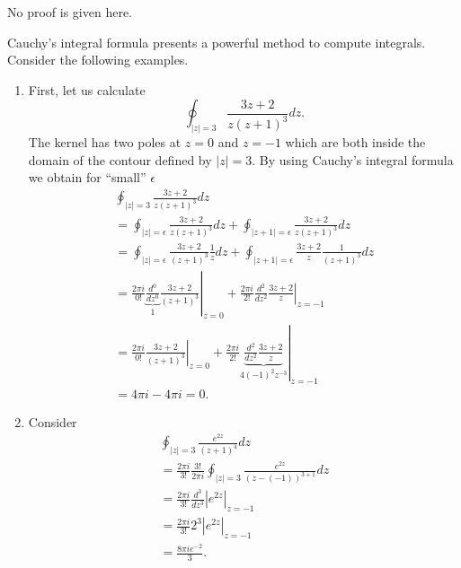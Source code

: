No proof is given here.


{
\color{blue}
\bexample
Cauchy's integral formula presents a powerful method to compute integrals.
Consider the following examples.

\begin{enumerate}

\item First,
let us calculate  $$\oint_{\vert z\vert =3} \frac{3z+2}{z(z+1)^3} dz.$$
The kernel has two poles at $z=0$ and $z=-1$ which are both inside the domain of the contour defined by $\vert z\vert =3$.
By using Cauchy's integral formula we obtain for ``small'' $\epsilon$
\begin{equation}
\begin{split}
\oint_{\vert z\vert =3} \frac{3z+2}{z(z+1)^3} dz  \\
 =\oint_{\vert z\vert =\epsilon} \frac{3z+2}{z(z+1)^3} dz    + \oint_{\vert z+1\vert =\epsilon} \frac{3z+2}{z(z+1)^3} dz \\
  =\oint_{\vert z\vert =\epsilon} \frac{3z+2}{(z+1)^3} \frac{1}{z} dz    + \oint_{\vert z+1\vert =\epsilon} \frac{3z+2}{z}\frac{1}{(z+1)^3} dz  \\
  =
\left.
\frac{2\pi i}{0!}
\underbrace{\frac{d^0}{dz^0}}_{1}
\frac{3z+2}{(z+1)^3}
\right|_{z=0}
+
\left.
\frac{2\pi i}{2!}
\frac{d^2}{dz^2}
\frac{3z+2}{z}
\right|_{z=-1} \\
  =
\left.
\frac{2\pi i}{0!}
\frac{3z+2}{(z+1)^3}
\right|_{z=0}
+
\left.
\frac{2\pi i}{2!}
\underbrace{\frac{d^2}{dz^2}
\frac{3z+2}{z}}_{4(-1)^2 z^{-3}}
\right|_{z=-1} \\
 = 4\pi i - 4 \pi i  =0.
\end{split}
\end{equation}

\item
Consider
\begin{equation}
\begin{split}
\oint_{\vert z\vert =3}
\frac{e^{2z}}{(z+1)^4 }dz\\
  =
\frac{2\pi i}{3!}
\frac{3!}{2\pi i}
\oint_{\vert z\vert =3}
\frac{e^{2z}}{(z- (-1))^{3+1} }dz  \\
  =
\frac{2\pi i}{3!}
\frac{d^3}{dz^3}
\left| e^{2z} \right|_{z=-1}  \\
  =
\frac{2\pi i}{3!}
2^3  \left| e^{2z} \right|_{z=-1}    \\
 =
\frac{8 \pi i e^{-2}}{3}.
\end{split}
\end{equation}

\end{enumerate}
\eexample
}


